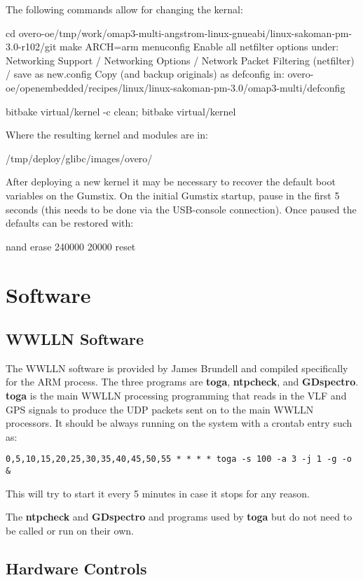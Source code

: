 The following commands allow for changing the kernal:

cd overo-oe/tmp/work/omap3-multi-angstrom-linux-gnueabi/linux-sakoman-pm-3.0-r102/git
make ARCH=arm menuconfig
Enable all netfilter options under: Networking Support / Networking Options / Network Packet Filtering (netfilter) /
save as new.config
Copy (and backup originals) as defconfig in:
overo-oe/openembedded/recipes/linux/linux-sakoman-pm-3.0/omap3-multi/defconfig

bitbake virtual/kernel -c clean; bitbake virtual/kernel

Where the resulting kernel and modules are in:

/tmp/deploy/glibc/images/overo/

After deploying a new kernel it may be necessary to recover the default boot variables on the Gumstix.
On the initial Gumstix startup, pause in the first 5 seconds (this needs to be done via the USB-console connection).
Once paused the defaults can be restored with:

nand erase 240000 20000
reset

\section{Software}

\subsection{WWLLN Software}

The WWLLN software is provided by James Brundell and compiled specifically for the ARM process.
The three programs are {\bf toga}, {\bf ntpcheck}, and {\bf GDspectro}.
{\bf toga} is the main WWLLN processing programming that reads in the VLF and GPS signals to produce the UDP packets sent on to the main WWLLN processors.
It should be always running on the system with a crontab entry such as:

\begin{verbatim}
0,5,10,15,20,25,30,35,40,45,50,55 * * * * toga -s 100 -a 3 -j 1 -g -o &
\end{verbatim}

This will try to start it every 5 minutes in case it stops for any reason.

The {\bf ntpcheck} and {\bf GDspectro} and programs used by {\bf toga} but do not need to be called or run on their own.

\subsection{Hardware Controls}

